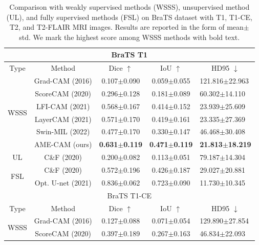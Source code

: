 \begin{table}
\centering
\caption{Comparison with weakly supervised methods (WSSS), unsupervised method (UL), and fully supervised methods (FSL) on BraTS dataset with T1, T1-CE, T2, and T2-FLAIR MRI images. Results are reported in the form of mean$\pm$std. We mark the highest score among WSSS methods with bold text.}
\label{Table:Compare_CAM_BraTS}
\begin{tabular}{c|c|c|c|l}
\hline
\multicolumn{5}{c}{BraTS T1} \\ \hline
Type           & Method            & Dice $\uparrow$         & IoU $\uparrow$          & \multicolumn{1}{c}{HD95 $\downarrow$}            \\ \hline
\multirow{6}{*}{WSSS}           & Grad-CAM (2016)   & 0.107$\pm$0.090 & 0.059$\pm$0.055 & 121.816$\pm$22.963 \\
               & ScoreCAM (2020)   & 0.296$\pm$0.128 & 0.181$\pm$0.089 & 60.302$\pm$14.110  \\
               & LFI-CAM (2021)    & 0.568$\pm$0.167 & 0.414$\pm$0.152 & 23.939$\pm$25.609  \\
               & LayerCAM (2021)   & 0.571$\pm$0.170 & 0.419$\pm$0.161 & 23.335$\pm$27.369  \\
               & Swin-MIL (2022)   & 0.477$\pm$0.170 & 0.330$\pm$0.147 & 46.468$\pm$30.408  \\
               & AME-CAM  (ours)   & \textbf{0.631$\pm$0.119} & \textbf{0.471$\pm$0.119} & \textbf{21.813$\pm$18.219}  \\ \hline
UL             & C\&F (2020)       & 0.200$\pm$0.082 & 0.113$\pm$0.051 & 79.187$\pm$14.304  \\ \hline
\multirow{2}{*}{FSL}            & C\&F (2020)       & 0.572$\pm$0.196 & 0.426$\pm$0.187 & 29.027$\pm$20.881  \\
               & Opt. U-net (2021) & 0.836$\pm$0.062 & 0.723$\pm$0.090 & 11.730$\pm$10.345  \\ \hline
\multicolumn{5}{c}{BraTS T1-CE} \\ \hline
Type           & Method            & Dice $\uparrow$         & IoU $\uparrow$          & \multicolumn{1}{c}{HD95 $\downarrow$}            \\ \hline
\multirow{6}{*}{WSSS}           & Grad-CAM (2016)   & 0.127$\pm$0.088 & 0.071$\pm$0.054 & 129.890$\pm$27.854 \\
               & ScoreCAM (2020)   & 0.397$\pm$0.189 & 0.267$\pm$0.163 & 46.834$\pm$22.093  \\

\end{tabular}
\end{table}
